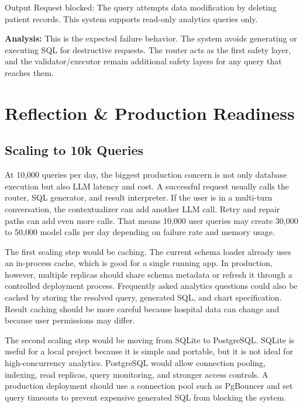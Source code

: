 \documentclass[11pt,a4paper]{article}
\begin{document}
\begin{warningbox}{Output}
Request blocked: The query attempts data modification by deleting patient records. This system supports read-only analytics queries only.
\end{warningbox}

\textbf{Analysis:} This is the expected failure behavior. The system avoids generating or executing SQL for destructive requests. The router acts as the first safety layer, and the validator/executor remain additional safety layers for any query that reaches them.

\section{Reflection \& Production Readiness}

\subsection{Scaling to 10k Queries}

At 10,000 queries per day, the biggest production concern is not only database execution but also LLM latency and cost. A successful request usually calls the router, SQL generator, and result interpreter. If the user is in a multi-turn conversation, the contextualizer can add another LLM call. Retry and repair paths can add even more calls. That means 10,000 user queries may create 30,000 to 50,000 model calls per day depending on failure rate and memory usage.

The first scaling step would be caching. The current schema loader already uses an in-process cache, which is good for a single running app. In production, however, multiple replicas should share schema metadata or refresh it through a controlled deployment process. Frequently asked analytics questions could also be cached by storing the resolved query, generated SQL, and chart specification. Result caching should be more careful because hospital data can change and because user permissions may differ.

The second scaling step would be moving from SQLite to PostgreSQL. SQLite is useful for a local project because it is simple and portable, but it is not ideal for high-concurrency analytics. PostgreSQL would allow connection pooling, indexing, read replicas, query monitoring, and stronger access controls. A production deployment should use a connection pool such as PgBouncer and set query timeouts to prevent expensive generated SQL from blocking the system.
\end{document}
